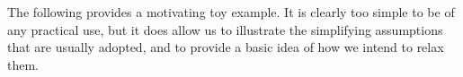 \documentclass[10pt,a4paper]{paper}
\theoremstyle{definition}
\begin{document}



The following provides a motivating toy example. 
It is clearly too simple to be of any practical use, but it does allow us to illustrate the simplifying assumptions that are usually adopted, and to provide a basic idea of how we intend to relax them.
\end{document}

